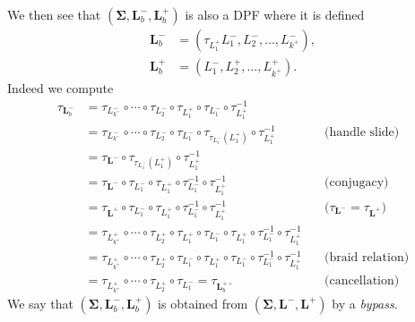 \documentclass[11pt]{amsart}
\newcommand{\thicc}[1]{\pmb{#1}}
\newcommand{\LagTuple}{\thicc{L}}
\begin{document}
We then see that $(\thicc{\Sigma}, \LagTuple_{b}^{-}, \LagTuple_{b}^{+})$ is also a DPF where it is defined
\begin{equation*}
\begin{aligned}
\LagTuple_{b}^{-} &= (\tau_{L^{+}_{1}}L^{-}_{1}, L^{-}_{2}, \dots, L^{-}_{k^{+}}),\\
\LagTuple_{b}^{+} &= (L^{-}_{1}, L^{+}_{2}, \dots, L^{+}_{k^{+}}).
\end{aligned}
\end{equation*}
Indeed we compute
\begin{equation*}
\begin{aligned}
\tau_{\LagTuple_{b}^{-}} &= \tau_{L^{-}_{k^{-}}}\circ \cdots \circ \tau_{L^{-}_{2}}\circ \tau_{L^{+}_{1}} \circ \tau_{L^{-}_{1}} \circ \tau_{L^{+}_{1}}^{-1} \\
&= \tau_{L^{-}_{k^{-}}}\circ \cdots \circ \tau_{L^{-}_{2}}\circ \tau_{L^{-}_{1}}  \circ \tau_{\tau_{L^{-}_{1}}(L^{+}_{1})}\circ \tau_{L^{+}_{1}}^{-1} &\quad \text{(handle slide)}\\
& = \tau_{\LagTuple^{-}}\circ \tau_{\tau_{L^{-}_{1}}(L^{+}_{1})}\circ \tau_{L^{+}_{1}}^{-1}\\
&= \tau_{\LagTuple^{-}}\circ \tau_{L^{-}_{1}} \circ \tau_{L^{+}_{1}} \circ \tau_{L^{-}_{1}}^{-1} \circ \tau_{L^{+}_{1}}^{-1} &\quad\text{(conjugacy)}\\
&= \tau_{\LagTuple^{+}} \circ \tau_{L^{-}_{1}} \circ \tau_{L^{+}_{1}} \circ \tau_{L^{-}_{1}}^{-1} \circ \tau_{L^{+}_{1}}^{-1} &\quad\text{($\tau_{\LagTuple^{-}} = \tau_{\LagTuple^{+}}$)}\\
&= \tau_{L^{+}_{k^{+}}}\circ \cdots \circ \tau_{L^{+}_{2}}\circ \tau_{L^{+}_{1}} \circ \tau_{L^{-}_{1}} \circ \tau_{L^{+}_{1}} \circ \tau_{L^{-}_{1}}^{-1} \circ \tau_{L^{+}_{1}}^{-1}\\
&= \tau_{L^{+}_{k^{+}}}\circ \cdots \circ \tau_{L^{+}_{2}}\circ \tau_{L^{-}_{1}} \circ \tau_{L^{+}_{1}} \circ \tau_{L^{-}_{1}} \circ \tau_{L^{-}_{1}}^{-1} \circ \tau_{L^{+}_{1}}^{-1} &\quad \text{(braid relation)}\\
&= \tau_{L^{+}_{k^{+}}}\circ \cdots \circ \tau_{L^{+}_{2}}\circ \tau_{L^{-}_{1}} = \tau_{\LagTuple^{+}_{b}}. &\quad\text{(cancellation)}
\end{aligned}
\end{equation*}
We say that $(\thicc{\Sigma}, \LagTuple_{b}^{-}, \LagTuple_{b}^{+})$ is obtained from $(\thicc{\Sigma}, \LagTuple^{-}, \LagTuple^{+})$ by a \emph{bypass}.
\end{document}
